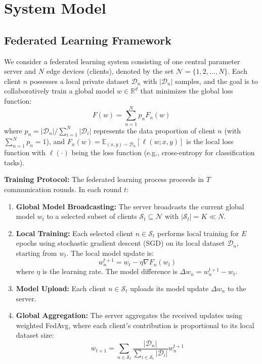 \section{System Model}



\subsection{Federated Learning Framework}

We consider a federated learning system consisting of one central parameter server and $N$ edge devices (clients), denoted by the set $\mathcal{N} = \{1, 2, \ldots, N\}$. Each client $n$ possesses a local private dataset $\mathcal{D}_n$ with $|\mathcal{D}_n|$ samples, and the goal is to collaboratively train a global model $w \in \mathbb{R}^d$ that minimizes the global loss function:
\begin{equation}
F(w) = \sum_{n=1}^{N} p_n F_n(w)
\end{equation}
where $p_n = |\mathcal{D}_n| / \sum_{i=1}^{N} |\mathcal{D}_i|$ represents the data proportion of client $n$ (with $\sum_{n=1}^{N} p_n = 1$), and $F_n(w) = \mathbb{E}_{(x,y) \sim \mathcal{D}_n}[\ell(w; x, y)]$ is the local loss function with $\ell(\cdot)$ being the loss function (e.g., cross-entropy for classification tasks).

\textbf{Training Protocol:} The federated learning process proceeds in $T$ communication rounds. In each round $t$:

\begin{enumerate}
\item \textbf{Global Model Broadcasting:} The server broadcasts the current global model $w_t$ to a selected subset of clients $\mathcal{S}_t \subseteq \mathcal{N}$ with $|\mathcal{S}_t| = K \ll N$.

\item \textbf{Local Training:} Each selected client $n \in \mathcal{S}_t$ performs local training for $E$ epochs using stochastic gradient descent (SGD) on its local dataset $\mathcal{D}_n$, starting from $w_t$. The local model update is:
\begin{equation}
w_n^{t+1} = w_t - \eta \nabla F_n(w_t)
\end{equation}
where $\eta$ is the learning rate. The model difference is $\Delta w_n = w_n^{t+1} - w_t$.

\item \textbf{Model Upload:} Each client $n \in \mathcal{S}_t$ uploads its model update $\Delta w_n$ to the server.

\item \textbf{Global Aggregation:} The server aggregates the received updates using weighted FedAvg, where each client's contribution is proportional to its local dataset size:
\begin{equation}
w_{t+1} = \sum_{n \in \mathcal{S}_t} \frac{|\mathcal{D}_n|}{\sum_{i \in \mathcal{S}_t} |\mathcal{D}_i|} w_n^{t+1}
\end{equation}
\end{enumerate}

